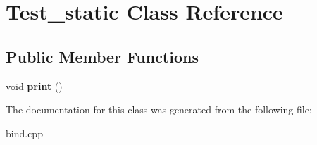\hypertarget{classTest__static}{}\section{Test\+\_\+static Class Reference}
\label{classTest__static}
\subsection*{Public Member Functions}
\begin{DoxyCompactItemize}
\item 
void {\bfseries print} ()\hypertarget{classTest__static_aa86e4992c7918e9fb7490c927556424e}{}\label{classTest__static_aa86e4992c7918e9fb7490c927556424e}

\end{DoxyCompactItemize}


The documentation for this class was generated from the following file\+:\begin{DoxyCompactItemize}
\item 
bind.\+cpp\end{DoxyCompactItemize}
